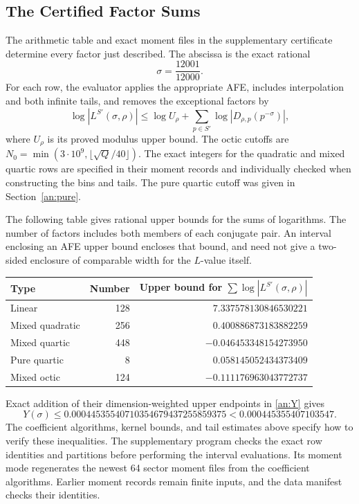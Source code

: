 \subsection{The Certified Factor Sums}
\label{an:factor-sums}

The arithmetic table and exact moment files in the supplementary
certificate determine every factor just described. The abscissa is
the exact rational
\[
 \sigma=\frac{12001}{12000}.
\]
For each row, the evaluator applies the appropriate AFE, includes
interpolation and both infinite tails, and removes the exceptional
factors by
\[
 \log|L^{S'}(\sigma,\rho)|
 \leq\log U_\rho+
       \sum_{p\in S'}\log|D_{\rho,p}(p^{-\sigma})|,
\]
where $U_\rho$ is its proved modulus upper bound.
The octic cutoffs are
$N_0=\min(3\cdot10^9,\lfloor\sqrt Q/40\rfloor)$.
The exact integers for the quadratic and mixed quartic rows are
specified in their moment records and individually checked when
constructing the bins and tails. The pure quartic cutoff was given
in Section~\ref{an:pure}.

The following table gives rational upper bounds for the sums of
logarithms. The number of factors includes both members of each
conjugate pair. An interval enclosing an AFE upper bound encloses that
bound, and need not give a two-sided enclosure of comparable width for
the $L$-value itself.
\begin{center}
\begin{tabular}{lrr}
\toprule
Type & Number & Upper bound for $\sum\log|L^{S'}(\sigma,\rho)|$\\
\midrule
Linear &128& $7.337578130846530221$\\
Mixed quadratic &256& $0.400886873183882259$\\
Mixed quartic &448& $-0.046453348154273950$\\
Pure quartic &8& $0.058145052434373409$\\
Mixed octic &124& $-0.111176963043772737$\\
\bottomrule
\end{tabular}
\end{center}
Exact addition of their dimension-weighted upper endpoints in
\eqref{an:Y} gives
\begin{equation}\label{an:Y-numerical}
 Y(\sigma)\leq0.00044535540710354679437255859375
             <0.000445355407103547.
\end{equation}
The coefficient algorithms, kernel bounds, and tail estimates above
specify how to verify these inequalities. The supplementary program
checks the exact row identities and partitions before performing the
interval evaluations. Its moment mode regenerates the newest 64 sector
moment files from the coefficient algorithms. Earlier moment records
remain finite inputs, and the data manifest checks their identities.

